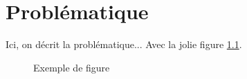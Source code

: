 \chapter{Problématique}

Ici, on décrit la problématique... Avec la jolie figure \ref{fig:ex}.

\begin{figure}[bp]
  \centering
  \caption{Exemple de figure}
  \label{fig:ex}
\end{figure}


